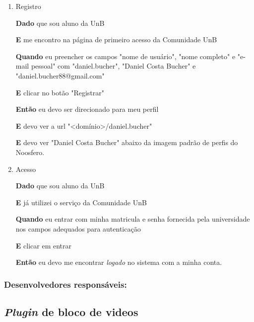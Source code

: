 \begin{enumerate}
\begin{enumerate}
\item Registro

\textbf{Dado} que sou aluno da UnB

\textbf{E} me encontro na página de primeiro acesso da Comunidade UnB

\textbf{Quando} eu preencher os campos "nome de usuário",
"nome completo" e "e-mail pessoal" com "daniel.bucher", "Daniel Costa Bucher" e
"daniel.bucher88@gmail.com"

\textbf{E} clicar no botão "Registrar"

\textbf{Então} eu devo ser direcionado para meu perfil

\textbf{E} devo ver a url "<domínio>/daniel.bucher"

\textbf{E} devo ver "Daniel Costa Bucher" abaixo da imagem padrão de perfis
do Noosfero.


\item Acesso

\textbf{Dado} que sou aluno da UnB

\textbf{E} já utilizei o serviço da Comunidade UnB

\textbf{Quando} eu entrar com minha matricula e senha fornecida pela universidade
nos campos adequados para autenticação

\textbf{E} clicar em entrar

\textbf{Então} eu devo me encontrar \textit{logado} no sistema com a minha conta.

\end{enumerate}

\end{enumerate}

\subsubsection*{Desenvolvedores responsáveis:}




\subsection{\textit{Plugin} de bloco de videos}

